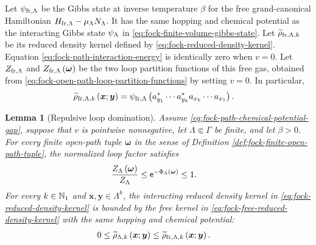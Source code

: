 \documentclass[11pt,a4paper]{article}
\theoremstyle{plain}
\newtheorem{lem}[thm]{Lemma}
\theoremstyle{definition}
\theoremstyle{remark}
\begin{document}
Let \(\oastate[\psi_{\txtfr,\Lambda}]\) be the Gibbs state at inverse temperature \(\beta\) for the free grand-canonical Hamiltonian \(\physham_{\txtfr,\Lambda}-\smchemicalpotential_{\Lambda}\opfocknumber_{\Lambda}\). It has the same hopping and chemical potential as the interacting Gibbs state \(\oastate[\psi_{\Lambda}]\) in \eqref{eq:fock-finite-volume-gibbs-state}. Let \(\widetilde{\rho}_{\mathrm{fr},\Lambda,k}\) be its reduced density kernel defined by \eqref{eq:fock-reduced-density-kernel}. Equation \eqref{eq:fock-path-interaction-energy} is identically zero when \(v=0\). Let \(Z_{\mathrm{fr},\Lambda}\) and \(Z_{\mathrm{fr},\Lambda} \left( \boldsymbol{\omega} \right)\) be the two loop partition functions of this free gas, obtained from \eqref{eq:fock-open-path-loop-partition-functions} by setting \(v=0\). In particular, \begin{equation}
\begin{aligned}
\fun{\widetilde{\rho}_{\txtfr,\Lambda,k}}{\boldsymbol{x};\boldsymbol{y}}
& =
\fun{\oastate[\psi_{\txtfr,\Lambda}]}{
\faadj{a_{y_1}}\cdots\faadj{a_{y_k}}a_{x_k}\cdots a_{x_1}}.
\end{aligned}
\label{eq:fock-free-reduced-density-kernel}
\end{equation}

\begin{lem}[Repulsive loop domination]\label{lem:fock-repulsive-loop-domination}
Assume \eqref{eq:fock-path-chemical-potential-gap}, suppose that $v$ is pointwise nonnegative, let
$\Lambda\Subset\Gamma$ be finite, and let $\beta>0$.
For every finite open-path tuple $\boldsymbol{\omega}$ in the sense of
Definition \ref{def:fock-finite-open-path-tuple}, the normalized loop factor satisfies
\begin{equation}
\begin{aligned}
\frac{Z_{\Lambda} \left( \boldsymbol{\omega} \right)}{Z_{\Lambda}}
& \leq
\mathsf{e}^{-\Phi_{\Lambda} \left( \boldsymbol{\omega} \right)}
\leq
1.
\end{aligned}
\label{eq:fock-interacting-loop-cancellation}
\end{equation}
For every $k\in\mathbb{N}_1$ and $\boldsymbol{x},\boldsymbol{y}\in\Lambda^k$, the interacting reduced density
kernel in \eqref{eq:fock-reduced-density-kernel} is bounded by the free kernel in
\eqref{eq:fock-free-reduced-density-kernel} with the same hopping and chemical potential:
\begin{equation}
\begin{aligned}
0
\leq
\widetilde{\rho}_{\Lambda,k} \left( \boldsymbol{x};\boldsymbol{y} \right)
& \leq
\widetilde{\rho}_{\mathrm{fr},\Lambda,k} \left( \boldsymbol{x};\boldsymbol{y} \right).
\end{aligned}
\label{eq:fock-reduced-density-domination}
\end{equation}
\end{lem}
\end{document}
